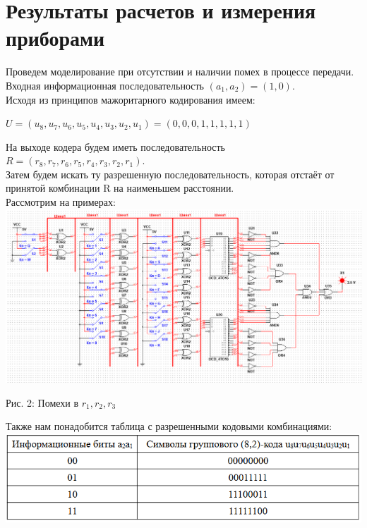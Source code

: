 \documentclass[14pt]{article}
\begin{document}
\section{Результаты расчетов и измерения приборами}
Проведем моделирование при отсутствии и наличии помех в процессе передачи. Входная информационная последовательность $(a_{1}, a_{2}) = (1, 0)$.\\
Исходя из принципов мажоритарного кодирования имеем:\\
\begin{center}
    $U = (u_{8}, u_{7}, u_{6}, u_{5}, u_{4}, u_{3}, u_{2}, u_{1}) = (0, 0, 0, 1, 1, 1, 1, 1)$\\
\end{center}
На выходе кодера будем иметь последовательность $R = (r_{8}, r_{7}, r_{6}, r_{5}, r_{4}, r_{3}, r_{2}, r_{1})$.\\
Затем будем искать ту разрешенную последовательность, которая отстаёт от принятой комбинации R на наименьшем расстоянии.\\
\newpage
Рассмотрим на примерах:\\
\includegraphics[width=1\linewidth]{123.png}
\begin{center}
Рис. 2: Помехи в $r_{1}, r_{2}, r_{3}$
\end{center}

Также нам понадобится таблица с разрешенными кодовыми комбинациями:\\

\includegraphics[width=1\linewidth]{razresh.png}
\end{document}
